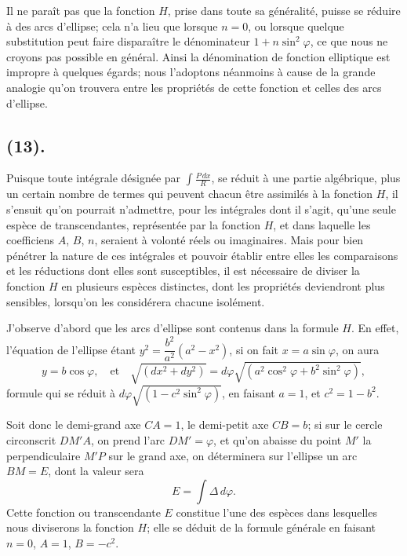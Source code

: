\documentclass{article}
\begin{document}
Il ne paraît pas que la fonction $H$, prise dans toute sa généralité, puisse se réduire à des arcs d'ellipse; cela n'a lieu que lorsque $n=0$, ou lorsque quelque substitution peut faire disparaître le dénominateur $1+n\sin^{2}\varphi$, ce que nous ne croyons pas possible en général. Ainsi la dénomination de fonction elliptique est impropre à quelques égards; nous l'adoptons néanmoins à cause de la grande analogie qu'on trouvera entre les propriétés de cette fonction et celles des arcs d'ellipse.


\subsection*{(13).}

Puisque toute intégrale désignée par $\displaystyle\int\frac{P\,dx}{R}$, se réduit à une partie algébrique, plus un certain nombre de termes qui peuvent chacun être assimilés à la fonction $H$, il s'ensuit qu'on pourrait n'admettre, pour les intégrales dont il s'agit, qu'une seule espèce de transcendantes, représentée par la fonction $H$, et dans laquelle les coefficiens $A$, $B$, $n$, seraient à volonté réels ou imaginaires. Mais pour bien pénétrer la nature de ces intégrales et pouvoir établir entre elles les comparaisons et les réductions dont elles sont susceptibles, il est nécessaire de diviser la fonction $H$ en plusieurs espèces distinctes, dont les propriétés deviendront plus sensibles, lorsqu'on les considérera chacune isolément.

J'observe d'abord que les arcs d'ellipse sont contenus dans la formule $H$. En effet, l'équation de l'ellipse étant $y^{2}=\dfrac{b^{2}}{a^{2}}(a^{2}-x^{2})$, si on fait $x=a\sin\varphi$, on aura
\[ y=b\cos\varphi,\quad\text{et}\quad\sqrt{(dx^{2}+dy^{2})}=d\varphi\sqrt{(a^{2}\cos^{2}\varphi+b^{2}\sin^{2}\varphi)}, \]
formule qui se réduit à $d\varphi\sqrt{(1-c^{2}\sin^{2}\varphi)}$, en faisant $a=1$, et $c^{2}=1-b^{2}$.


Soit donc le demi-grand axe $CA=1$, le demi-petit axe $CB=b$; si sur le cercle circonscrit $DM'A$, on prend l'arc $DM'=\varphi$, et qu'on abaisse du point $M'$ la perpendiculaire $M'P$ sur le grand axe, on déterminera sur l'ellipse un arc $BM=E$, dont la valeur sera
\[ E=\int\Delta\,d\varphi. \]
Cette fonction ou transcendante $E$ constitue l'une des espèces dans lesquelles nous diviserons la fonction $H$; elle se déduit de la formule générale en faisant $n=0$, $A=1$, $B=-c^{2}$.
\end{document}
